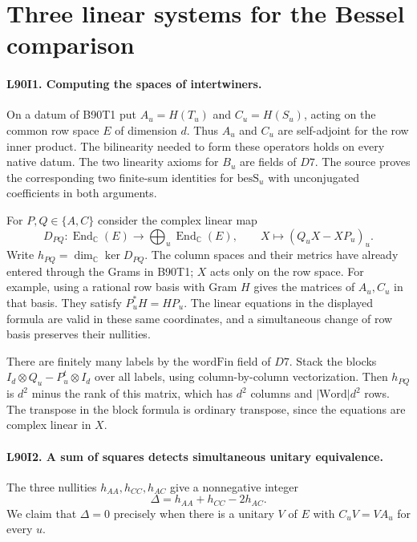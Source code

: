 \section{Three linear systems for the Bessel comparison}

\paragraph{L90I1. Computing the spaces of intertwiners.}
On a datum of B90T1 put $A_u=H(T_u)$ and $C_u=H(S_u)$, acting
on the common row space $E$ of dimension $d$. Thus $A_u$ and $C_u$
are self-adjoint for the row inner product. The bilinearity needed to
form these operators holds on every native datum. The two linearity
axioms for $B_u$ are fields of $D7$. The source proves the corresponding
two finite-sum identities for $\mathrm{besS}_u$ with unconjugated
coefficients in both arguments.

For $P,Q\in\{A,C\}$ consider the complex linear map
\[
  D_{PQ}:\operatorname{End}_{\mathbb C}(E)\longrightarrow
           \bigoplus_{u}\operatorname{End}_{\mathbb C}(E),
  \qquad X\longmapsto(Q_uX-XP_u)_u.
\]
Write $h_{PQ}=\dim_{\mathbb C}\ker D_{PQ}$. The column spaces and
their metrics have already entered through the Grams in B90T1;
$X$ acts only on the row space. For example, using a rational row
basis with Gram $H$ gives the matrices of $A_u,C_u$ in that basis.
They satisfy $P_u^*H=HP_u$. The linear equations in the displayed
formula are valid in these same coordinates, and a simultaneous
change of row basis preserves their nullities.

There are finitely many labels by the $\mathrm{wordFin}$ field of
$D7$. Stack the blocks $I_d\otimes Q_u-P_u^t\otimes I_d$ over all
labels, using column-by-column vectorization. Then $h_{PQ}$ is
$d^2$ minus the rank of this matrix, which has $d^2$ columns and
$|\mathrm{Word}|d^2$ rows. The transpose in the block formula is
ordinary transpose, since the equations are complex linear in $X$.

\paragraph{L90I2. A sum of squares detects simultaneous unitary equivalence.}
The three nullities $h_{AA},h_{CC},h_{AC}$ give a nonnegative
integer
\[
                     \Delta=h_{AA}+h_{CC}-2h_{AC}.
\]
We claim that $\Delta=0$ precisely when there is a unitary $V$ of
$E$ with $C_uV=VA_u$ for every $u$.

